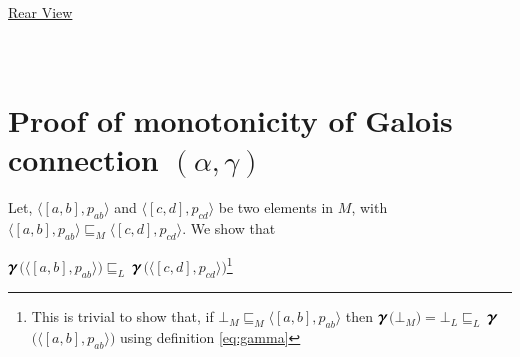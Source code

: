 \documentclass[final,3p, review, times]{util/elsarticle}
\newcommand{\GAMMA}{\large\boldsymbol{\gamma}\normalsize}
\begin{document}
\\\\\\\\\\\\\\\\\\\\\\\\\\\\\\\\\\\\\\\\\\\\\\\\\\\\\
\centerline{\underline{\Large{Rear View}}}
\newpage








\section{\\Proof of monotonicity of Galois connection $(\alpha,\gamma)$}
\label{app:monotonicity}

Let, $\langle[a,b],p_{ab}\rangle$ and $\langle[c,d],p_{cd}\rangle$ be two elements in $M$, with $\langle[a,b],p_{ab}\rangle\sqsubseteq_M\langle[c,d],p_{cd}\rangle$. We show that

\centerline{
  $\GAMMA$$\Big(\langle[a,b],p_{ab}\rangle\Big)\sqsubseteq_L\ $$\GAMMA$$\Big(\langle[c,d],p_{cd}\rangle\Big)$\footnote{This is trivial to show that, if $\bot_M\sqsubseteq_M\langle[a,b],p_{ab}\rangle$ then $\GAMMA$$\Big(\bot_M\Big)=\bot_L\sqsubseteq_L\ $$\GAMMA$$\Big(\langle[a,b],p_{ab}\rangle\Big)$ using definition \ref{eq:gamma}}
}
\end{document}
